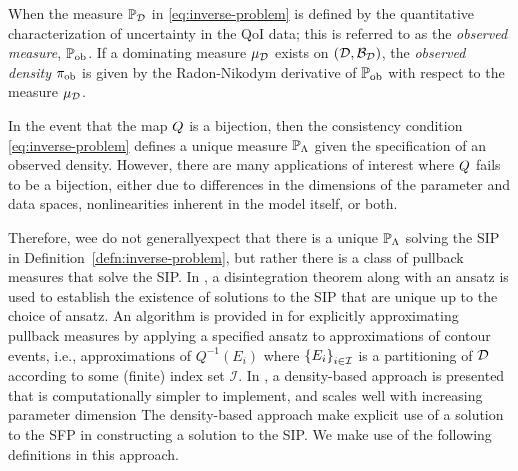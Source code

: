 \begin{defn}\label{defn:observed}
  When the measure $\mathbb{P}_{\mathcal{D}}$ in \eqref{eq:inverse-problem} is defined by the quantitative characterization of uncertainty in the QoI data; this is referred to as the \emph{observed measure}, $\operatorname*{\mathbb{P}_{ob}}$.
  If a dominating measure $\mu_{\mathcal{D}}$ exists on $(\mathcal{D}, \mathcal{B}_{\mathcal{D}})$, the \emph{observed density} $\operatorname*{\pi_{ob}}$ is given by the Radon-Nikodym derivative of $\operatorname*{\mathbb{P}_{ob}}$ with respect to the measure $\mu_{\mathcal{D}}$.
\end{defn}


In the event that the map $Q$ is a bijection, then the consistency condition \eqref{eq:inverse-problem} defines a unique measure $\mathbb{P}_{\Lambda}$ given the specification of an observed density.
However, there are many applications of interest where $Q$ fails to be a bijection, either due to differences in the dimensions of the parameter and data spaces, nonlinearities inherent in the model itself, or both.


Therefore, wee do not generallyexpect that there is a unique $\mathbb{P}_{\Lambda}$ solving the SIP in Definition~\ref{defn:inverse-problem}, but rather there is a class of pullback measures that solve the SIP.
In \cite{BET+14}, a disintegration theorem \cite{Chang_Pollard} along with an ansatz is used to establish the existence of solutions to the SIP that are unique up to the choice of ansatz.
An algorithm is provided in \cite{BET+14} for explicitly approximating pullback measures by applying a specified ansatz to approximations of contour events, i.e., approximations of $Q^{-1}(E_i)$ where $\left\{E_i\right\}_{i\in\mathcal{I}}$ is a partitioning of $\mathcal{D}$ according to some (finite) index set $\mathcal{I}$.
In \cite{BJW18a}, a density-based approach is presented that is computationally simpler to implement, and scales well with increasing parameter dimension
The density-based approach make explicit use of a solution to the SFP in constructing a solution to the SIP.
We make use of the following definitions in this approach.

